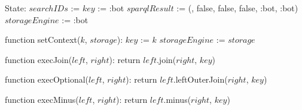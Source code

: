 State:
    $searchIDs$ := {}
    $key$ := :bot
    $sparqlResult$ := ({}, false, false, false, :bot, :bot)
    $storageEngine$ := :bot

function setContext($k$, $storage$):
    $key$ := $k$
    $storageEngine$ := $storage$

function execJoin($left$, $right$):
    return $left$.join($right$, $key$)

function execOptional($left$, $right$):
    return $left$.leftOuterJoin($right$, $key$)

function execMinus($left$, $right$):
    return $left$.minus($right$, $key$)